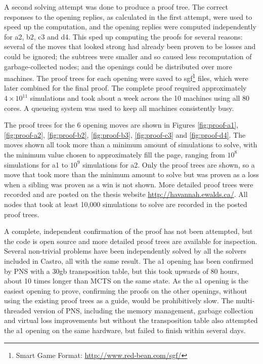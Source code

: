 A second solving attempt was done to produce a proof tree. The correct responses to the opening replies, as calculated in the first attempt, were used to speed up the computation, and the opening replies were computed independently for a2, b2, c3 and d4. This sped up computing the proofs for several reasons: several of the moves that looked strong had already been proven to be losses and could be ignored; the subtrees were smaller and so caused less recomputation of garbage-collected nodes; and the openings could be distributed over more machines. The proof trees for each opening were saved to sgf\footnote{Smart Game Format: \url{http://www.red-bean.com/sgf/}} files, which were later combined for the final proof. The complete proof required approximately $4 \times 10^{11}$ simulations and took about a week across the 10 machines using all 80 cores. A queueing system was used to keep all machines consistently busy.

The proof trees for the 6 opening moves are shown in Figures \ref{fig:proof-a1}, \ref{fig:proof-a2}, \ref{fig:proof-b2}, \ref{fig:proof-b3}, \ref{fig:proof-c3} and \ref{fig:proof-d4}. The moves shown all took more than a minimum amount of simulations to solve, with the minimum value chosen to approximately fill the page, ranging from $10^{8}$ simulations for a1 to $10^{9}$ simulations for a2. Only the proof trees are shown, so a move that took more than the minimum amount to solve but was proven as a loss when a sibling was proven as a win is not shown. More detailed proof trees were recorded and are posted on the thesis website \url{http://havannah.ewalds.ca/}. All nodes that took at least 10,000 simulations to solve are recorded in the posted proof trees.

A complete, independent confirmation of the proof has not been attempted, but the code is open source and more detailed proof trees are available for inspection. Several non-trivial problems have been independently solved by all the solvers included in Castro, all with the same result. The a1 opening has been confirmed by PNS with a 30gb transposition table, but this took upwards of 80 hours, about 10 times longer than MCTS on the same state. As the a1 opening is the easiest opening to prove, confirming the proofs on the other openings, without using the existing proof trees as a guide, would be prohibitively slow. The multi-threaded version of PNS, including the memory management, garbage collection and virtual loss improvements but without the transposition table also attempted the a1 opening on the same hardware, but failed to finish within several days.

